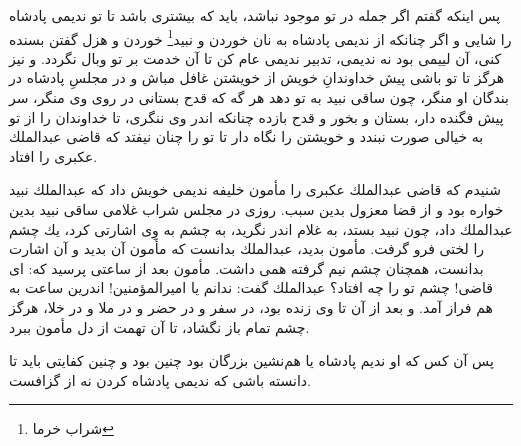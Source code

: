 پس اينكه گفتم اگر جمله در تو موجود نباشد، بايد كه بيشترى باشد تا تو نديمى پادشاه را شايى و اگر چنانكه از نديمى پادشاه به نان خوردن و نبيد\footnote{شراب خرما} خوردن و هزل گفتن بسنده كنى، آن لييمى بود نه نديمى، تدبير نديمى عام كن تا آن خدمت بر تو وبال نگردد. و نيز هرگز تا تو باشى پيش خداوندانِ خويش از خويشتن غافل مباش و در مجلسِ پادشاه در بندگان او منگر، چون ساقى نبيد به تو دهد هر گه كه قدح بستانى در روى وى منگر، سر پيش فگنده دار، بستان و بخور و قدح بازده چنانكه اندر وى ننگرى، تا خداوندان را از تو به خيالى صورت نبندد و خويشتن را نگاه دار تا تو را چنان نيفتد كه قاضى عبد‌الملك عكبرى را افتاد.

شنيدم كه قاضى عبدالملك عكبرى را مأمون خليفه نديمى خويش داد كه عبدالملك نبيد خواره بود و از قضا معزول بدين سبب. روزى در مجلس شراب غلامى ساقى نبيد بدين عبدالملك داد، چون نبيد بستد، به غلام اندر نگريد، به چشم به وِى اشارتى كرد، يك چشم را لختى فرو گرفت. مأمون بديد، عبدالملك بدانست كه مأمون آن بديد و آن اشارت بدانست، همچنان چشم نيم گرفته همى داشت. مأمون بعد از ساعتى پرسيد كه: اى قاضى! چشم تو را چه افتاد؟ عبدالملك گفت: ندانم يا اميرالمؤمنين! اندرين ساعت به هم فراز آمد. و بعد از آن تا وى زنده بود، در سفر و در حضر و در ملا و در خلا، هرگز چشم تمام باز نگشاد، تا آن تهمت از دل مأمون ببرد.

پس آن كس كه او نديم پادشاه يا هم‌نشين بزرگان بود چنين بود و چنين كفايتى بايد تا دانسته باشى كه نديمى پادشاه كردن نه از گزافست.



\newpage


